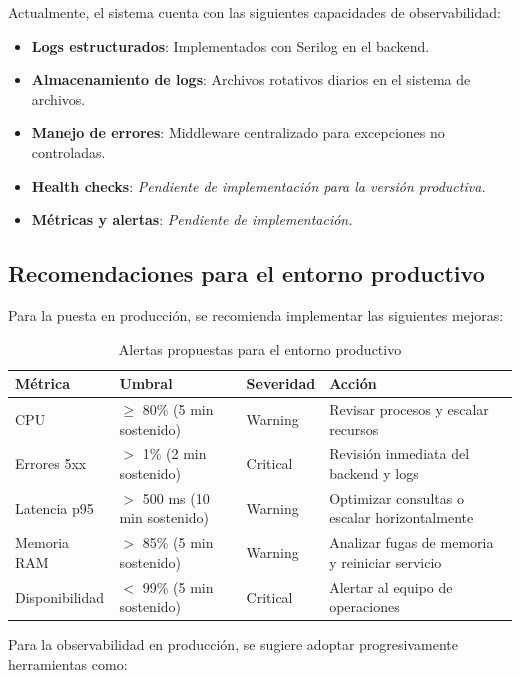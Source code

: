 \documentclass[12pt,letterpaper]{article}
\begin{document}
Actualmente, el sistema cuenta con las siguientes capacidades de observabilidad:

\begin{itemize}
    \item \textbf{Logs estructurados}: Implementados con Serilog en el backend.
    \item \textbf{Almacenamiento de logs}: Archivos rotativos diarios en el sistema de archivos.
    \item \textbf{Manejo de errores}: Middleware centralizado para excepciones no controladas.
    \item \textbf{Health checks}: \textit{Pendiente de implementación para la versión productiva.}
    \item \textbf{Métricas y alertas}: \textit{Pendiente de implementación.}
\end{itemize}

\subsection{Recomendaciones para el entorno productivo}

Para la puesta en producción, se recomienda implementar las siguientes mejoras:

\begin{table}[H]
    \centering
    \caption{Alertas propuestas para el entorno productivo}
    \label{tab:alertas}
    \begin{tabular}{|l|l|l|p{5cm}|}
        \hline
        \textbf{Métrica} & \textbf{Umbral} & \textbf{Severidad} & \textbf{Acción} \\ \hline
        CPU & $\ge$ 80\% (5 min sostenido) & Warning & Revisar procesos y escalar recursos \\ \hline
        Errores 5xx & $>$ 1\% (2 min sostenido) & Critical & Revisión inmediata del backend y logs \\ \hline
        Latencia p95 & $>$ 500 ms (10 min sostenido) & Warning & Optimizar consultas o escalar horizontalmente \\ \hline
        Memoria RAM & $>$ 85\% (5 min sostenido) & Warning & Analizar fugas de memoria y reiniciar servicio \\ \hline
        Disponibilidad & $<$ 99\% (5 min sostenido) & Critical & Alertar al equipo de operaciones \\ \hline
    \end{tabular}
\end{table}

Para la observabilidad en producción, se sugiere adoptar progresivamente herramientas como:
\end{document}
